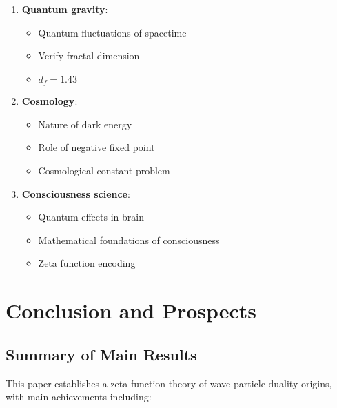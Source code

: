 \documentclass[11pt]{article}
\theoremstyle{plain}
\theoremstyle{definition}
\theoremstyle{remark}
\begin{document}
\begin{enumerate}
\item \textbf{Quantum gravity}:
   \begin{itemize}
   \item Quantum fluctuations of spacetime
   \item Verify fractal dimension
   \item $d_f = 1.43$
   \end{itemize}

\item \textbf{Cosmology}:
   \begin{itemize}
   \item Nature of dark energy
   \item Role of negative fixed point
   \item Cosmological constant problem
   \end{itemize}

\item \textbf{Consciousness science}:
   \begin{itemize}
   \item Quantum effects in brain
   \item Mathematical foundations of consciousness
   \item Zeta function encoding
   \end{itemize}
\end{enumerate}

\section{Conclusion and Prospects}

\subsection{Summary of Main Results}

This paper establishes a zeta function theory of wave-particle duality origins, with main achievements including:
\end{document}
